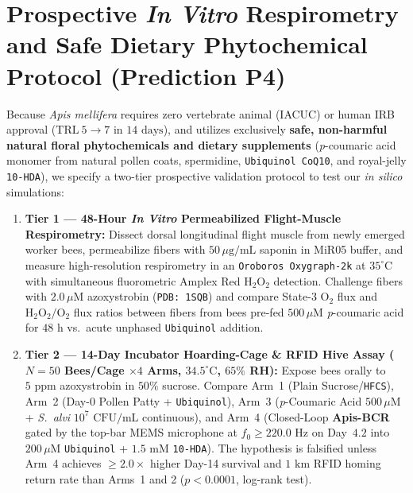 \documentclass[11pt]{article}
\begin{document}
\section{Prospective \textit{In Vitro} Respirometry and Safe Dietary Phytochemical Protocol (Prediction P4)}

Because \textit{Apis mellifera} requires zero vertebrate animal (IACUC) or human IRB approval ($\mathrm{TRL\ 5 \to 7}$ in $14\text{ days}$), and utilizes exclusively \textbf{safe, non-harmful natural floral phytochemicals and dietary supplements} (\textit{p}-coumaric acid monomer from natural pollen coats, spermidine, \texttt{Ubiquinol CoQ10}, and royal-jelly \texttt{10-HDA}), we specify a two-tier prospective validation protocol to test our \textit{in silico} simulations:
\begin{enumerate}
  \item \textbf{Tier 1 --- 48-Hour \textit{In Vitro} Permeabilized Flight-Muscle Respirometry:} Dissect dorsal longitudinal flight muscle from newly emerged worker bees, permeabilize fibers with $50\,\mu\mathrm{g/mL}$ saponin in MiR05 buffer, and measure high-resolution respirometry in an \texttt{Oroboros Oxygraph-2k} at $35^\circ\mathrm{C}$ with simultaneous fluorometric Amplex Red $\mathrm{H}_2\mathrm{O}_2$ detection. Challenge fibers with $2.0\,\mu\mathrm{M}$ azoxystrobin (\texttt{PDB: 1SQB}) and compare State-3 $\mathrm{O}_2$ flux and $\mathrm{H}_2\mathrm{O}_2/\mathrm{O}_2$ flux ratios between fibers from bees pre-fed $500\,\mu\mathrm{M}$ \textit{p}-coumaric acid for $48\text{ h}$ vs.\ acute unphased \texttt{Ubiquinol} addition.
  \item \textbf{Tier 2 --- 14-Day Incubator Hoarding-Cage \& RFID Hive Assay ($N=50$ Bees/Cage $\times 4$ Arms, $34.5^\circ\mathrm{C}$, $65\%$ RH):} Expose bees orally to $5\text{ ppm}$ azoxystrobin in $50\%$ sucrose. Compare Arm~1 (Plain Sucrose/\texttt{HFCS}), Arm~2 (Day-0 Pollen Patty + \texttt{Ubiquinol}), Arm~3 (\textit{p}-Coumaric Acid $500\,\mu\mathrm{M}$ + \textit{S.\ alvi} $10^7\text{ CFU/mL}$ continuous), and Arm~4 (Closed-Loop \textbf{Apis-BCR} gated by the top-bar MEMS microphone at $f_0 \ge 220.0\text{ Hz}$ on Day~$4.2$ into $200\,\mu\mathrm{M}$ \texttt{Ubiquinol} + $1.5\text{ mM}$ \texttt{10-HDA}). The hypothesis is falsified unless Arm~4 achieves $\ge 2.0\times$ higher Day-14 survival and $1\text{ km}$ RFID homing return rate than Arms~1 and 2 ($p < 0.0001$, log-rank test).
\end{enumerate}
\end{document}
